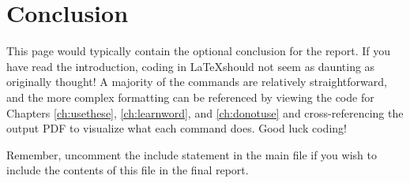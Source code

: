 \chapter{Conclusion}\label{ch:concl}
	This page would typically contain the optional conclusion for the report. If you have read the introduction, coding in \LaTeX\space should not seem as daunting as originally thought! A majority of the commands are relatively straightforward, and the more complex formatting can be referenced by viewing the code for Chapters \ref{ch:usethese}, \ref{ch:learnword}, and \ref{ch:donotuse} and cross-referencing the output PDF to visualize what each command does. Good luck coding!
	
	Remember, uncomment the include statement in the main file if you wish to include the contents of this file in the final report.